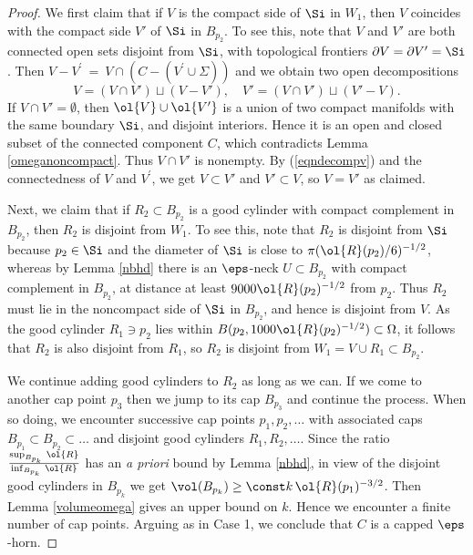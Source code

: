 \begin{proof}
We first claim that if $V$ is the compact side of $\Si$ in $W_1$,
then $V$ coincides with the
compact side $V'$ of $\Si$ in $B_{p_2}$.  To see this, note that $V$ and $V'$
are both connected open sets disjoint from $\Si$, with topological
frontiers $\partial V=\partial V'=\Si$.  Then
$V - V^\prime \: = \: V \cap (C - (V^\prime \cup \Sigma))$
and we obtain two
open decompositions
\begin{equation}
\label{eqndecompv}
V=(V\cap V')\sqcup (V-V'),\quad V'=(V\cap V')\sqcup (V'-V).
\end{equation}
If $V\cap V'=\emptyset$, then $\ol{V}\cup\ol{V'}$ is a union of
two compact manifolds with the same boundary $\Si$, and disjoint interiors.
Hence it is an open
and closed subset of the connected component $C$, which contradicts
Lemma \ref{omeganoncompact}.  Thus $V\cap V'$ is nonempty.
By (\ref{eqndecompv}) and the connectedness of $V$ and $V^\prime$,
we get $V\subset V'$ and $V'\subset V$,
so $V=V'$ as claimed.

Next, we claim that if $R_2\subset B_{p_2}$ is a good cylinder
with compact complement in $B_{p_2}$, then $R_2$ is disjoint from $W_1$.
To see this,  note that  $R_2$ is disjoint from $\Si$ because
$p_2 \in \Si$ and the diameter
of $\Si$ is close to $\pi (\ol{R}(p_2)/6)^{-1/2}$, whereas by Lemma \ref{nbhd}
there is an $\eps$-neck $U\subset B_{p_2}$ with compact complement in
$B_{p_2}$, at distance at least $9000 \ol{R}(p_2)^{-1/2}$ from $p_2$.
Thus $R_2$ must lie in the noncompact side of $\Si$ in $B_{p_2}$, and
hence is disjoint from $V$.
As the good cylinder
$R_1 \ni p_2$ lies within $B(p_2, 1000 \ol{R}(p_2)^{-1/2}) \subset \Omega$,
it follows that $R_2$ is also disjoint from $R_1$,
so $R_2$ is disjoint from $W_1=V\cup R_1\subset B_{p_2}$.

We continue adding good cylinders to $R_2$ as long as we can.
If we come
to another cap point $p_3$ then we jump to its cap
$B_{p_3}$ and continue the process.
When so doing, we encounter
successive cap points $p_1, p_2, \ldots$ with associated caps
$B_{p_1}\subset B_{p_2} \subset \ldots$ and disjoint good cylinders
$R_1, R_2, \ldots$.
Since the ratio
$\frac{\sup_{B_{p_k}}\,\ol{R}}{\inf_{B_{p_k}}\,\ol{R}}$ has an
{\it a priori}
bound by Lemma \ref{nbhd},
in view of the disjoint good cylinders in $B_{p_k}$
we get $\vol(B_{p_k})\geq \const  k\,\ol{R}(p_1)^{-3/2}$.
Then Lemma \ref{volumeomega} gives
an upper bound on $k$.  Hence we encounter a finite
number of cap points.
Arguing as in Case 1,
we conclude that $C$ is a capped $\eps$-horn.
\end{proof}



